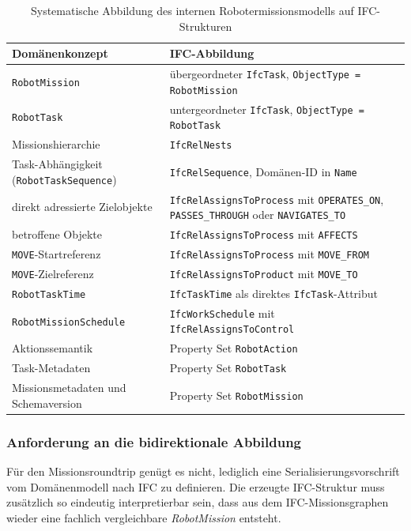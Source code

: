 \begin{table}[htbp]
  \centering
  \small
  \renewcommand{\arraystretch}{1.3}
  \begin{tabularx}{\textwidth}{@{}|>{\raggedright\arraybackslash}p{}|X|@{}}
    \hline
    \textbf{Domänenkonzept} & \textbf{IFC-Abbildung} \\
    \hline
    \texttt{RobotMission}
      & übergeordneter \texttt{IfcTask}, \texttt{ObjectType = RobotMission} \\
    \hline
    \texttt{RobotTask}
      & untergeordneter \texttt{IfcTask}, \texttt{ObjectType = RobotTask} \\
    \hline
    Missionshierarchie
      & \texttt{IfcRelNests} \\
    \hline
    Task-Abhängigkeit (\texttt{RobotTaskSequence})
      & \texttt{IfcRelSequence}, Domänen-ID in \texttt{Name} \\
    \hline
    direkt adressierte Zielobjekte
      & \texttt{IfcRelAssignsToProcess} mit \texttt{OPERATES\_ON}, \texttt{PASSES\_THROUGH} oder \texttt{NAVIGATES\_TO} \\
    \hline
    betroffene Objekte
      & \texttt{IfcRelAssignsToProcess} mit \texttt{AFFECTS} \\
    \hline
    \texttt{MOVE}-Startreferenz
      & \texttt{IfcRelAssignsToProcess} mit \texttt{MOVE\_FROM} \\
    \hline
    \texttt{MOVE}-Zielreferenz
      & \texttt{IfcRelAssignsToProduct} mit \texttt{MOVE\_TO} \\
    \hline
    \texttt{RobotTaskTime}
      & \texttt{IfcTaskTime} als direktes \texttt{IfcTask}-Attribut \\
    \hline
    \texttt{RobotMissionSchedule}
      & \texttt{IfcWorkSchedule} mit \texttt{IfcRelAssignsToControl} \\
    \hline
    Aktionssemantik
      & Property Set \texttt{RobotAction} \\
    \hline
    Task-Metadaten
      & Property Set \texttt{RobotTask} \\
    \hline
    Missionsmetadaten und Schemaversion
      & Property Set \texttt{RobotMission} \\
    \hline
  \end{tabularx}
  \caption{Systematische Abbildung des internen Robotermissionsmodells auf IFC-Strukturen}
  \label{tab:mapping-domaene-ifc}
\end{table}
\FloatBarrier

\subsubsection{Anforderung an die bidirektionale Abbildung}
Für den Missionsroundtrip genügt es nicht, lediglich eine Serialisierungsvorschrift vom
Domänenmodell nach IFC zu definieren. Die erzeugte IFC-Struktur muss zusätzlich so eindeutig
interpretierbar sein, dass aus dem IFC-Missionsgraphen wieder eine fachlich vergleichbare
\textit{RobotMission} entsteht.


